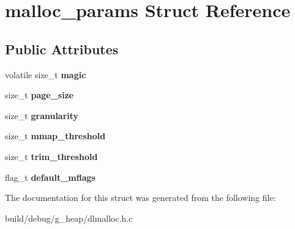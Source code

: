 \hypertarget{structmalloc__params}{\section{malloc\-\_\-params Struct Reference}
\label{structmalloc__params}
}
\subsection*{Public Attributes}
\begin{DoxyCompactItemize}
\item 
\hypertarget{structmalloc__params_ab7d65aee4df94359c442ac28553364bd}{volatile size\-\_\-t {\bfseries magic}}\label{structmalloc__params_ab7d65aee4df94359c442ac28553364bd}

\item 
\hypertarget{structmalloc__params_a3b7a605d7ebe148a8fb3051465dc3979}{size\-\_\-t {\bfseries page\-\_\-size}}\label{structmalloc__params_a3b7a605d7ebe148a8fb3051465dc3979}

\item 
\hypertarget{structmalloc__params_aa0609453d9ec826c8ffc632cbfb8cf68}{size\-\_\-t {\bfseries granularity}}\label{structmalloc__params_aa0609453d9ec826c8ffc632cbfb8cf68}

\item 
\hypertarget{structmalloc__params_a5b2af958efc37d52cfa905bc98b41e1b}{size\-\_\-t {\bfseries mmap\-\_\-threshold}}\label{structmalloc__params_a5b2af958efc37d52cfa905bc98b41e1b}

\item 
\hypertarget{structmalloc__params_accae9b2bcb4df63efcdc0b18826cc578}{size\-\_\-t {\bfseries trim\-\_\-threshold}}\label{structmalloc__params_accae9b2bcb4df63efcdc0b18826cc578}

\item 
\hypertarget{structmalloc__params_a0bd6b4819a5d7c629c5ab56262f6296d}{flag\-\_\-t {\bfseries default\-\_\-mflags}}\label{structmalloc__params_a0bd6b4819a5d7c629c5ab56262f6296d}

\end{DoxyCompactItemize}


The documentation for this struct was generated from the following file\-:\begin{DoxyCompactItemize}
\item 
build/debug/g\-\_\-heap/dlmalloc.\-h.\-c\end{DoxyCompactItemize}
